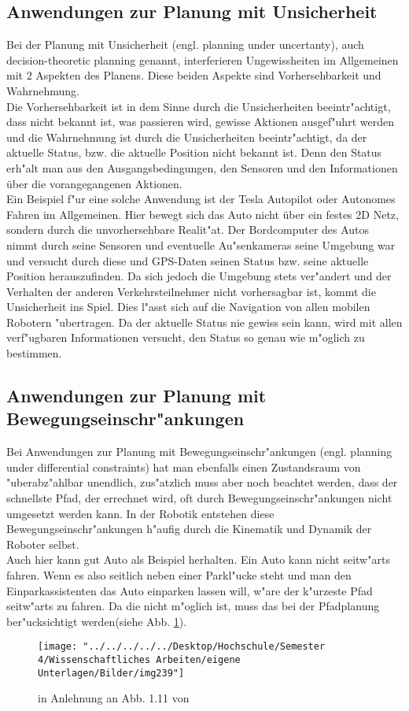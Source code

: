 \subsection{Anwendungen zur Planung mit Unsicherheit}
Bei der Planung mit Unsicherheit (engl. planning under uncertanty), auch decision-theoretic planning genannt, interferieren Ungewissheiten im Allgemeinen mit 2 Aspekten des Planens. Diese beiden Aspekte sind Vorhersehbarkeit und Wahrnehmung.\\
Die Vorhersehbarkeit ist in dem Sinne durch die Unsicherheiten beeintr"achtigt, dass nicht bekannt ist, was passieren wird, gewisse Aktionen ausgef"uhrt werden und die Wahrnehmung ist durch die Unsicherheiten beeintr"achtigt, da der aktuelle Status, bzw. die aktuelle Position nicht bekannt ist. Denn den Status erh"alt man aus den Ausgangsbedingungen, den Sensoren und den Informationen über die vorangegangenen Aktionen.\\
Ein Beispiel f"ur eine solche Anwendung ist der Tesla Autopilot oder Autonomes Fahren im Allgemeinen. Hier bewegt sich das Auto nicht über ein festes 2D Netz, sondern durch die unvorhersehbare Realit"at. Der Bordcomputer des Autos nimmt durch seine Sensoren und eventuelle Au"senkameras seine Umgebung war und versucht durch diese und GPS-Daten seinen Status bzw. seine aktuelle Position herauszufinden. Da sich jedoch die Umgebung stets ver"andert und der Verhalten der anderen Verkehrsteilnehmer nicht vorhersagbar ist, kommt die Unsicherheit ins Spiel.
Dies l"asst sich auf die Navigation von allen mobilen Robotern "ubertragen.
Da der aktuelle Status nie gewiss sein kann, wird mit allen verf"ugbaren Informationen versucht, den Status so genau wie m"oglich zu bestimmen.
\subsection{Anwendungen zur Planung mit Bewegungseinschr"ankungen}
Bei Anwendungen zur Planung mit Bewegungseinschr"ankungen (engl. planning under differential constraints) hat man ebenfalls einen Zustandsraum von "uberabz"ahlbar unendlich, zus"atzlich muss aber noch beachtet werden, dass der schnellste Pfad, der errechnet wird, oft durch Bewegungseinschr"ankungen nicht umgesetzt werden kann. In der Robotik entstehen diese Bewegungseinschr"ankungen h"aufig durch die Kinematik und Dynamik der Roboter selbst.\\
Auch hier kann gut Auto als Beispiel herhalten. Ein Auto kann nicht seitw"arts fahren. Wenn es also seitlich neben einer Parkl"ucke steht und man den Einparkassistenten das Auto einparken lassen will, w"are der k"urzeste Pfad seitw"arts zu fahren. Da die nicht m"oglich ist, muss das bei der Pfadplanung ber"ucksichtigt werden(siehe Abb. \ref{Abb. 5.3}).
\begin{figure}
	\centering
	\texttt{[image: "../../../../../Desktop/Hochschule/Semester 4/Wissenschaftliches Arbeiten/eigene Unterlagen/Bilder/img239"]}
	\caption{in Anlehnung an Abb. 1.11 von \cite[~S. 15]{Lav06}}
	\label{Abb. 5.3}
\end{figure}

